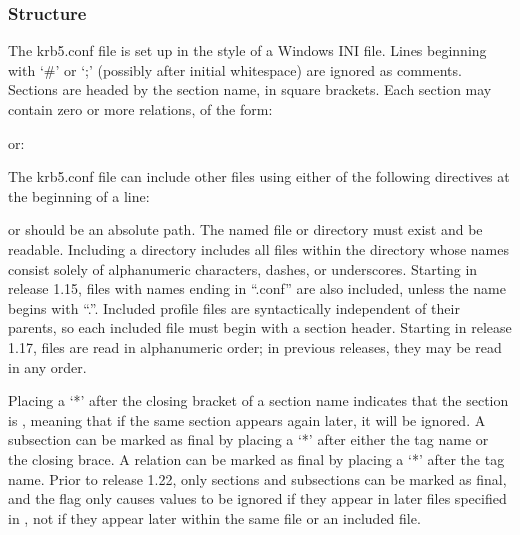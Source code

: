 \documentclass[letterpaper,10pt,english]{sphinxmanual}
\begin{document}
\subsubsection{Structure}
\label{\detokenize{admin/conf_files/krb5_conf:structure}}
\sphinxAtStartPar
The krb5.conf file is set up in the style of a Windows INI file.
Lines beginning with ‘\#’ or ‘;’ (possibly after initial whitespace)
are ignored as comments.  Sections are headed by the section name, in
square brackets.  Each section may contain zero or more relations, of
the form:

\begin{sphinxVerbatim}[commandchars=\\\{\}]
  
\end{sphinxVerbatim}

\sphinxAtStartPar
or:

\begin{sphinxVerbatim}[commandchars=\\\{\}]
  
      
      
\end{sphinxVerbatim}

\sphinxAtStartPar
The krb5.conf file can include other files using either of the
following directives at the beginning of a line:

\begin{sphinxVerbatim}[commandchars=\\\{\}]
 
 
\end{sphinxVerbatim}

\sphinxAtStartPar
{} or  should be an absolute path. The named file or
directory must exist and be readable.  Including a directory includes
all files within the directory whose names consist solely of
alphanumeric characters, dashes, or underscores.  Starting in release
1.15, files with names ending in “.conf” are also included, unless the
name begins with “.”.  Included profile files are syntactically
independent of their parents, so each included file must begin with a
section header.  Starting in release 1.17, files are read in
alphanumeric order; in previous releases, they may be read in any
order.

\sphinxAtStartPar
Placing a ‘*’ after the closing bracket of a section name indicates
that the section is , meaning that if the same section appears
again later, it will be ignored.  A subsection can be marked as final
by placing a ‘*’ after either the tag name or the closing brace.  A
relation can be marked as final by placing a ‘*’ after the tag name.
Prior to release 1.22, only sections and subsections can be marked as
final, and the flag only causes values to be ignored if they appear in
later files specified in , not if they appear later
within the same file or an included file.
\end{document}
